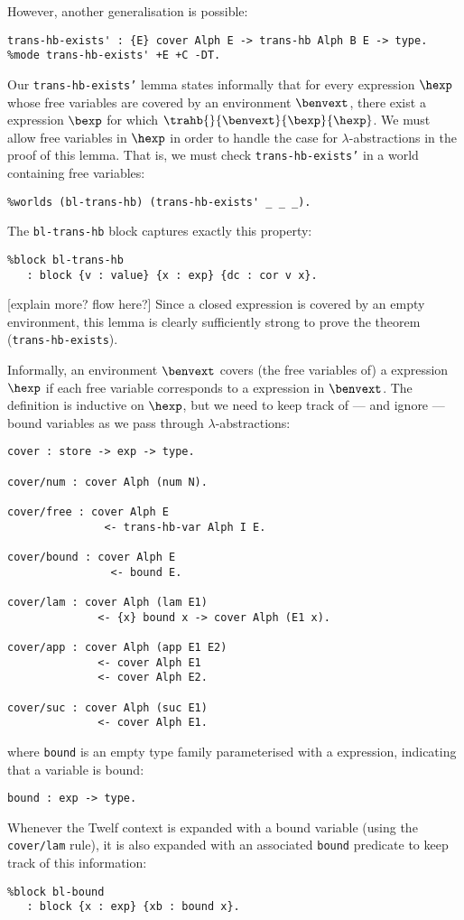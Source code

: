 
However, another generalisation is possible:
\begin{verbatim}
trans-hb-exists' : {E} cover Alph E -> trans-hb Alph B E -> type.
%mode trans-hb-exists' +E +C -DT.
\end{verbatim}
Our \texttt{trans-hb-exists'} lemma states informally that for every \hlang expression $\hexp$ whose free variables are covered by an environment $\benvext$, there exist a \blang expression $\bexp$ for which $\trahb{}{\benvext}{\bexp}{\hexp}$.
We must allow free variables in $\hexp$ in order to handle the case for $\lambda$-abstractions in the proof of this lemma.
That is, we must check \texttt{trans-hb-exists'} in a world containing free variables:
\begin{verbatim}
%worlds (bl-trans-hb) (trans-hb-exists' _ _ _).
\end{verbatim}
The \texttt{bl-trans-hb} block captures exactly this property:
\begin{verbatim}
%block bl-trans-hb
   : block {v : value} {x : exp} {dc : cor v x}.
\end{verbatim}
[explain more? flow here?]
Since a closed expression is covered by an empty environment, this lemma is clearly sufficiently strong to prove the theorem (\texttt{trans-hb-exists}).

Informally, an environment $\benvext$ covers (the free variables of) a \hlang expression $\hexp$ if each free variable corresponds to a \blang expression in $\benvext$.
The definition is inductive on $\hexp$, but we need to keep track of --- and ignore --- bound variables as we pass through $\lambda$-abstractions:
\begin{verbatim}
cover : store -> exp -> type.

cover/num : cover Alph (num N).

cover/free : cover Alph E
               <- trans-hb-var Alph I E.

cover/bound : cover Alph E
                <- bound E.

cover/lam : cover Alph (lam E1)
              <- {x} bound x -> cover Alph (E1 x).

cover/app : cover Alph (app E1 E2)
              <- cover Alph E1
              <- cover Alph E2.

cover/suc : cover Alph (suc E1)
              <- cover Alph E1.
\end{verbatim}
where \texttt{bound} is an empty type family parameterised with a \hlang expression, indicating that a variable is bound:
\begin{verbatim}
bound : exp -> type.
\end{verbatim}
Whenever the Twelf context is expanded with a bound variable (using the \texttt{cover/lam} rule), it is also expanded with an associated \texttt{bound} predicate to keep track of this information:
\begin{verbatim}
%block bl-bound
   : block {x : exp} {xb : bound x}.
\end{verbatim}

